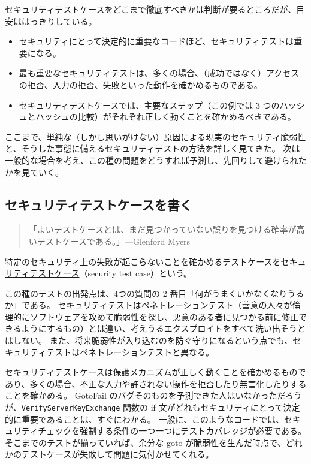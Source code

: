 \documentclass[uplatex]{jsarticle}
\def\label#1{}%
\begin{document}
セキュリティテストケースをどこまで徹底すべきかは判断が要るところだが、目安ははっきりしている。

\begin{itemize}
\item セキュリティにとって決定的に重要なコードほど、セキュリティテストは重要になる。
\item 最も重要なセキュリティテストは、多くの場合、（成功ではなく）アクセスの拒否、入力の拒否、失敗といった動作を確かめるものである。
\item セキュリティテストケースでは、主要なステップ（この例では 3 つのハッシュとハッシュの比較）がそれぞれ正しく動くことを確かめるべきである。
\end{itemize}

ここまで、単純な（しかし思いがけない）原因による現実のセキュリティ脆弱性と、そうした事態に備えるセキュリティテストの方法を詳しく見てきた。
次は一般的な場合を考え、この種の問題をどうすれば予測し、先回りして避けられたかを見ていく。

\subsection{セキュリティテストケースを書く}

\begin{quote}
「よいテストケースとは、まだ見つかっていない誤りを見つける確率が高いテストケースである。」\hfill ---Glenford Myers
\end{quote}

\begin{dfn}[セキュリティテストケース]\label{dfn:ch12-security-test-case}
特定のセキュリティ上の失敗が起こらないことを確かめるテストケースを\underline{セキュリティテストケース}（security test case）という。
\end{dfn}

この種のテストの出発点は、4つの質問の 2 番目「何がうまくいかなくなりうるか」である。
セキュリティテストはペネトレーションテスト（善意の人々が倫理的にソフトウェアを攻めて脆弱性を探し、悪意のある者に見つかる前に修正できるようにするもの）とは違い、考えうるエクスプロイトをすべて洗い出そうとはしない。
また、将来脆弱性が入り込むのを防ぐ守りになるという点でも、セキュリティテストはペネトレーションテストと異なる。

セキュリティテストケースは保護メカニズムが正しく動くことを確かめるものであり、多くの場合、不正な入力や許されない操作を拒否したり無害化したりすることを確かめる。
GotoFail のバグそのものを予測できた人はいなかっただろうが、\texttt{VerifyServerKeyExchange} 関数の if 文がどれもセキュリティにとって決定的に重要であることは、すぐにわかる。
一般に、このようなコードでは、セキュリティチェックを強制する条件の一つ一つにテストカバレッジが必要である。
そこまでのテストが揃っていれば、余分な goto が脆弱性を生んだ時点で、どれかのテストケースが失敗して問題に気付かせてくれる。
\end{document}
